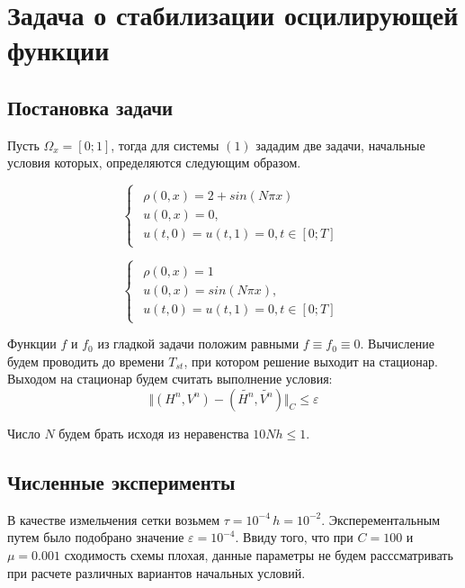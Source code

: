 \section{Задача о стабилизации осцилирующей функции}
\subsection{Постановка задачи}

Пусть $\Omega_x=[0;1]$, тогда для системы $(1)$ зададим две задачи, начальные условия которых, определяются следующим образом.

\begin{equation}
	\begin{cases}
		\begin{array}{l}
			\rho(0, x) = 2 + sin(N\pi x)\\
			u(0, x) = 0,\\
			u(t, 0) = u(t, 1) = 0, t \in [0; T]
		\end{array}
	\end{cases}
\end{equation}

\begin{equation}
	\begin{cases}
		\begin{array}{l}
			\rho(0, x) = 1\\
			u(0, x) = sin(N\pi x), \\
			u(t, 0) = u(t, 1) = 0, t \in [0; T]
		\end{array}
	\end{cases}
\end{equation}

Функции $f$ и $f_0$ из гладкой задачи положим равными $f \equiv f_0 \equiv 0$. Вычисление будем проводить до времени $T_{st}$, при котором решение выходит на стационар. Выходом на стационар будем считать выполнение условия:
$$
\Vert (H^n, V^n) - (\tilde{H^n}, \tilde{V^n}) \Vert_C \leq \varepsilon
$$

Число $N$ будем брать исходя из неравенства $10Nh \leq 1$.

\newpage
\subsection{Численные эксперименты}
В качестве измельчения сетки возьмем $\tau = 10^{-4} \, h = 10^{-2}$. Эксперементальным путем было подобрано значение $\varepsilon = 10^{-4}$. Ввиду того, что при $C = 100$ и $\mu = 0.001$ сходимость схемы плохая, данные параметры не будем расссматривать при расчете различных вариантов начальных условий.

